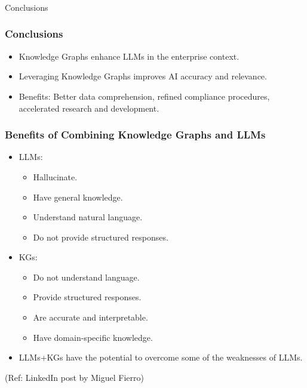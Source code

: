 \begin{frame}[fragile]\frametitle{}
\begin{center}
{\Large Conclusions}

\end{center}
\end{frame}


\begin{frame}[fragile]\frametitle{Conclusions}
\begin{itemize}
\item Knowledge Graphs enhance LLMs in the enterprise context.
\item Leveraging Knowledge Graphs improves AI accuracy and relevance.
\item Benefits: Better data comprehension, refined compliance procedures, accelerated research and development.
\end{itemize}
\end{frame}

\begin{frame}[fragile]\frametitle{Benefits of Combining Knowledge Graphs and LLMs}

\begin{itemize}
\item LLMs:
	\begin{itemize}
	\item  Hallucinate.
	\item   Have general knowledge.
	\item   Understand natural language.
	\item   Do not provide structured responses.
	\end{itemize}

\item KGs:
	\begin{itemize}
	\item   Do not understand language.
	\item   Provide structured responses.
	\item   Are accurate and interpretable.
	\item   Have domain-specific knowledge.
	\end{itemize}

\item LLMs+KGs have the potential to overcome some of the weaknesses of LLMs.

\end{itemize}

{\tiny (Ref: LinkedIn post by Miguel Fierro)}


\end{frame}


